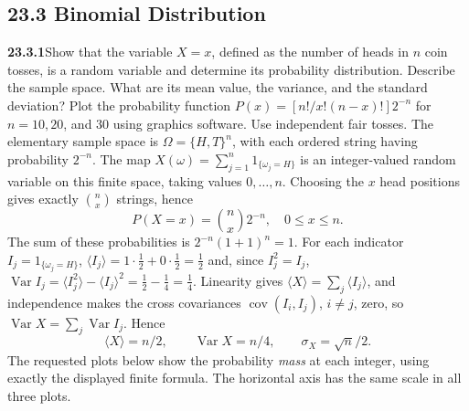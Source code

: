 \subsection*{23.3 Binomial Distribution}

\par\bigskip
\noindent\textbf{23.3.1}\quad Show that the variable $X=x$,
defined as the number of heads in $n$  coin tosses, is a random
variable and determine its probability distribution. Describe the
sample space. What are its mean value, the variance, and the
standard deviation? Plot the probability function
$P(x)=[n!/x!(n-x)!]2^{-n}$ for $n=10,20$, and $30$ using
graphics software.
\solution
Use independent fair tosses. The elementary sample space is
$\Omega=\{H,T\}^n$, with each ordered string having probability $2^{-n}$.
The map $X(\omega)=\sum_{j=1}^n1_{\{\omega_j=H\}}$ is an integer-valued
random variable on this finite space, taking values $0,\ldots,n$.
Choosing the $x$ head positions gives exactly $\binom nx$ strings, hence
\[
\boxed{P(X=x)=\binom nx2^{-n},\quad 0\le x\le n}.
\]
The sum of these probabilities is $2^{-n}(1+1)^n=1$.
For each indicator $I_j=1_{\{\omega_j=H\}}$,
$\langle I_j\rangle=1\cdot\frac12+0\cdot\frac12=\frac12$ and, since
$I_j^2=I_j$, $\operatorname{Var}I_j=\langle I_j^2\rangle-\langle
I_j\rangle^2=\frac12-\frac14=\frac14$. Linearity gives
$\langle X\rangle=\sum_j\langle I_j\rangle$, and independence makes the
cross covariances $\operatorname{cov}(I_i,I_j)$, $i\ne j$, zero, so
$\operatorname{Var}X=\sum_j\operatorname{Var}I_j$. Hence
\[
\boxed{\langle X\rangle=n/2,\qquad\operatorname{Var}X=n/4,
\qquad\sigma_X=\sqrt n/2}.
\]
The requested plots below show the probability \emph{mass} at each
integer, using exactly the displayed finite formula. The horizontal
axis has the same scale in all three plots.
